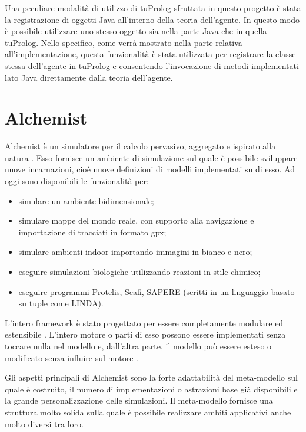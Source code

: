 Una peculiare modalità di utilizzo di tuProlog sfruttata in questo progetto è stata la registrazione di oggetti Java all'interno della teoria dell'agente. In questo modo è possibile utilizzare uno stesso oggetto sia nella parte Java che in quella tuProlog. Nello specifico, come verrà mostrato nella parte relativa all'implementazione, questa funzionalità è stata utilizzata per registrare la classe stessa dell'agente in tuProlog e consentendo l'invocazione di metodi implementati lato Java direttamente dalla teoria dell'agente.


\section{Alchemist}
Alchemist è un simulatore per il calcolo pervasivo, aggregato e ispirato alla natura \cite{alchemist-jos2013}. Esso fornisce un ambiente di simulazione sul quale è possibile sviluppare nuove incarnazioni, cioè nuove definizioni di modelli implementati su di esso. Ad oggi sono disponibili le funzionalità per:
\begin{itemize}
\item simulare un ambiente bidimensionale;
\item simulare mappe del mondo reale, con supporto alla navigazione e importazione di tracciati in formato gpx;
\item simulare ambienti indoor importando immagini in bianco e nero;
\item eseguire simulazioni biologiche utilizzando reazioni in stile chimico;
\item eseguire programmi Protelis, Scafi, SAPERE (scritti in un linguaggio basato su tuple come LINDA).
\end{itemize}

L'intero framework è stato progettato per essere completamente modulare ed estensibile \cite{alchemist-jos2013}.
L'intero motore o parti di esso possono essere implementati senza toccare nulla nel modello e, dall'altra parte, il modello può essere esteso o modificato senza influire sul motore \cite{alchemist-jos2013}.

Gli aspetti principali di Alchemist sono la forte adattabilità del meta-modello sul quale è costruito, il numero di implementazioni o astrazioni base già disponibili e la grande personalizzazione delle simulazioni.
Il meta-modello fornisce una struttura molto solida sulla quale è possibile realizzare ambiti applicativi anche molto diversi tra loro.

